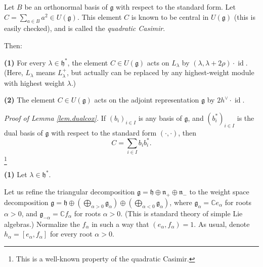 \documentclass[etingof-lie.tex]{subfiles}
\begin{document}
\begin{lemma}
\label{lem.dualcox}Let $B$ be an orthonormal basis of $\mathfrak{g}$ with
respect to the standard form. Let $C=\sum\limits_{a\in B}a^{2}\in U\left(
\mathfrak{g}\right)  $. This element $C$ is known to be central in $U\left(
\mathfrak{g}\right)  $ (this is easily checked), and is called the
\textit{quadratic Casimir}.

Then:

\textbf{(1)} For every $\lambda\in\mathfrak{h}^{\ast}$, the element $C\in
U\left(  \mathfrak{g}\right)  $ acts on $L_{\lambda}$ by $\left(
\lambda,\lambda+2\rho\right)  \cdot\operatorname*{id}$. (Here, $L_{\lambda}$
means $L_{\lambda}^{+}$, but actually can be replaced by any highest-weight
module with highest weight $\lambda$.)

\textbf{(2)} The element $C\in U\left(  \mathfrak{g}\right)  $ acts on the
adjoint representation $\mathfrak{g}$ by $2h^{\vee}\cdot\operatorname*{id}$.
\end{lemma}

\textit{Proof of Lemma \ref{lem.dualcox}.} If $\left(  b_{i}\right)  _{i\in
I}$ is any basis of $\mathfrak{g}$, and $\left(  b_{i}^{\ast}\right)  _{i\in
I}$ is the dual basis of $\mathfrak{g}$ with respect to the standard form
$\left(  \cdot,\cdot\right)  $, then%
\begin{equation}
C=\sum\limits_{i\in I}b_{i}b_{i}^{\ast}. \label{pf.dualcox.Csum}%
\end{equation}
\footnote{This is a well-known property of the quadratic Casimir.}

\textbf{(1)} Let $\lambda\in\mathfrak{h}^{\ast}$.

Let us refine the triangular decomposition $\mathfrak{g}=\mathfrak{h}%
\oplus\mathfrak{n}_{+}\oplus\mathfrak{n}_{-}$ to the weight space
decomposition $\mathfrak{g}=\mathfrak{h}\oplus\left(  \bigoplus\limits_{\alpha
>0}\mathfrak{g}_{\alpha}\right)  \oplus\left(  \bigoplus\limits_{\alpha
<0}\mathfrak{g}_{\alpha}\right)  $, where $\mathfrak{g}_{\alpha}%
=\mathbb{C}e_{\alpha}$ for roots $\alpha>0$, and $\mathfrak{g}_{-\alpha
}=\mathbb{C}f_{\alpha}$ for roots $\alpha>0$. (This is standard theory of
simple Lie algebras.) Normalize the $f_{\alpha}$ in such a way that $\left(
e_{\alpha},f_{\alpha}\right)  =1$. As usual, denote $h_{\alpha}=\left[
e_{\alpha},f_{\alpha}\right]  $ for every root $\alpha>0$.
\end{document}
